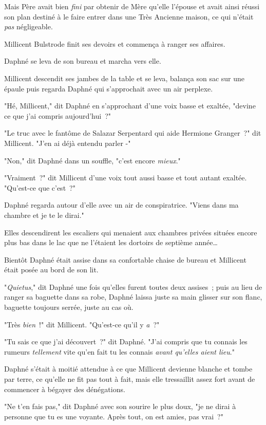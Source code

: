 Mais Père avait bien \emph{fini} par obtenir de Mère qu'elle l'épouse et avait ainsi réussi son plan destiné à le faire entrer dans une Très Ancienne maison, ce qui n'était \emph{pas} négligeable.

Millicent Bulstrode finit ses devoirs et commença à ranger ses affaires.

Daphné se leva de son bureau et marcha vers elle.

Millicent descendit ses jambes de la table et se leva, balança son sac sur une épaule puis regarda Daphné qui s'approchait avec un air perplexe.

"Hé, Millicent," dit Daphné en s'approchant d'une voix basse et exaltée, "devine ce que j'ai compris aujourd'hui~?"

"Le truc avec le fantôme de Salazar Serpentard qui aide Hermione Granger~?" dit Millicent. "J'en ai déjà entendu parler -"

"Non," dit Daphné dans un souffle, "c'est encore \emph{mieux}."

"Vraiment~?" dit Millicent d'une voix tout aussi basse et tout autant exaltée. "Qu'est-ce que c'est~?"

Daphné regarda autour d'elle avec un air de conspiratrice. "Viens dans ma chambre et je te le dirai."

Elles descendirent les escaliers qui menaient aux chambres privées situées encore plus bas dans le lac que ne l'étaient les dortoirs de septième année…

Bientôt Daphné était assise dans sa confortable chaise de bureau et Millicent était posée au bord de son lit.

"\emph{Quietus}," dit Daphné une fois qu'elles furent toutes deux assises~; puis au lieu de ranger sa baguette dans sa robe, Daphné laissa juste sa main glisser sur son flanc, baguette toujours serrée, juste au cas où.

"Très \emph{bien}~!" dit Millicent. "Qu'est-ce qu'il y \emph{a}~?"

"Tu sais ce que j'ai découvert~?" dit Daphné. "J'ai compris que tu connais les rumeurs \emph{tellement} vite qu'en fait tu les connais \emph{avant qu'elles aient lieu}."

Daphné s'était à moitié attendue à ce que Millicent devienne blanche et tombe par terre, ce qu'elle ne fit pas tout à fait, mais elle tressaillit assez fort avant de commencer à bégayer des dénégations.

"Ne t'en fais pas," dit Daphné avec son sourire le plus doux, "je ne dirai à personne que tu es une voyante. Après tout, on est amies, pas vrai~?"

